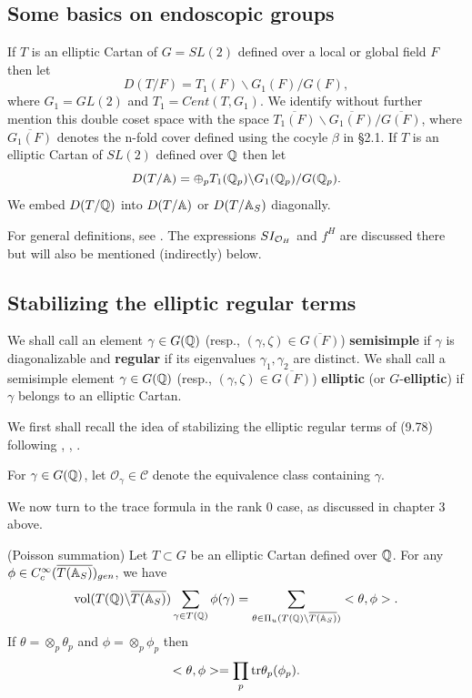 \subsection{Some basics on endoscopic groups}

If $T$ is an elliptic Cartan of $G=SL(2)$ defined over
a local or global field $F$ then let
\begin{equation}
D(T/F)=T_1(F)\backslash G_1(F)/G(F),
\end{equation}
where $G_1=GL(2)$ and $T_1=Cent(T,G_1)$.
We identify without further mention this double coset space with the
space
$\overline{T_1(F)}\backslash \overline{G_1(F)}/ \overline{G(F)}$,
where $\overline{G_1(F)}$ denotes the n-fold cover defined using the
cocyle $\beta$ in \S 2.1.
If $T$ is an elliptic Cartan of $SL(2)$ defined over
${\Bbb Q}$ then let
\begin{equation}
D(T/{\Bbb{A}})
=\oplus_p T_1({\Bbb{Q}}_p)\backslash G_1({\Bbb{Q}}_p)/G({\Bbb{Q}}_p).
\end{equation}
We embed $D(T/{\Bbb{Q}})$ into $D(T/{\Bbb{A}})$
or $D(T/{\Bbb{A}}_S)$ diagonally.

For general definitions, see \cite{L3}.
The expressions $SI_{{\cal{O}}_H}$ and $f^H$ are discussed there but
will also be mentioned (indirectly) below.

\subsection{Stabilizing the elliptic regular terms}

We shall call an element
$\gamma\in G({\Bbb{Q}})$ (resp.,
$(\gamma,\zeta) \in \overline{G(F)}$) \textbf{semisimple} if $\gamma $ is
diagonalizable and {\bf regular} if its eigenvalues
$\gamma_1,\gamma_2$ are distinct.
We shall call a semisimple element
$\gamma \in G({\Bbb{Q}})$
(resp., $(\gamma,\zeta) \in \overline{G(F)}$) \textbf{elliptic}
(or $G$-\textbf{elliptic}) if $\gamma $ belongs to
an elliptic Cartan.

We first shall recall the idea of stabilizing the elliptic regular terms of
(9.78) following \cite{LL}, \cite{L3}, \cite{Ko1}.

For $\gamma \in G({\Bbb{Q}})$, let
${\mathcal{O}}_\gamma \in {\mathcal{C}}$ denote
the equivalence class containing $\gamma $. 

We now turn to the trace formula in the rank $0$ case, as discussed in
chapter 3 above.

\begin{proposition} (Poisson summation)
Let $T\subset G$ be an elliptic Cartan defined over ${\Bbb{Q}}$. For any
$\phi \in C_c^\infty (\overline{T({\Bbb{A}}_S)})_{gen}$, we have 
\[
{\mathrm{vol}}(T({\Bbb{Q}})\backslash \overline{T({\Bbb{A}}_S)})
\sum_{\gamma \in T({\Bbb{Q}})}\phi (\gamma ) \\
=\sum_{\theta \in \Pi _u(T({\Bbb{Q}})\backslash \overline{T({\Bbb{A}}_S)})}
<\theta,\phi>.
\]
If $\theta =\otimes _p\theta _p$ and $\phi=\otimes _p \phi_p$ then 
\[
<\theta ,\phi>=\prod_p{\rm tr}\theta _p(\phi_p).
\]
\end{proposition}


